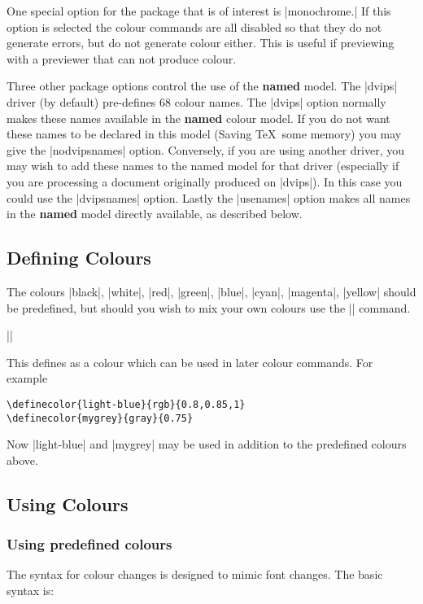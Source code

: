 One special option for the  package 
that is of interest is |monochrome.|
If this option is selected the colour commands are all
disabled so that they do not generate errors, but do not generate colour
either. This is useful if previewing with a previewer that can not
produce colour.

Three other package options control the use of the \textbf{named} model.
The |dvips| driver (by default) pre-defines 68 colour names. The |dvips|
option normally makes these names available in the \textbf{named} colour
model. If you do not want these names to be declared in  this model
(Saving \TeX\ some memory) you may give the |nodvipsnames|
option. Conversely, if you are using another driver, you may wish to
add these names to the named model for that driver (especially if you
are processing a document originally produced on |dvips|). In this case
you could use the |dvipsnames| option. Lastly the |usenames| option
makes all names in the \textbf{named} model directly available, as
described below.

\subsection{Defining Colours}

The colours |black|, |white|, |red|, |green|, |blue|, |cyan|,
|magenta|, |yellow| should be predefined, but should you wish to mix
your own colours use the |\definecolor| command.

\begin{decl}
|\definecolor|
\end{decl}


This defines  as a colour which can be used in later colour
commands. For example
\begin{verbatim}
\definecolor{light-blue}{rgb}{0.8,0.85,1}
\definecolor{mygrey}{gray}{0.75}
\end{verbatim}

Now |light-blue| and |mygrey| may be used in addition to the
predefined colours above.

\subsection{Using Colours}

\subsubsection{Using predefined colours}
The syntax for colour changes is designed to mimic font changes.
The basic syntax is:

